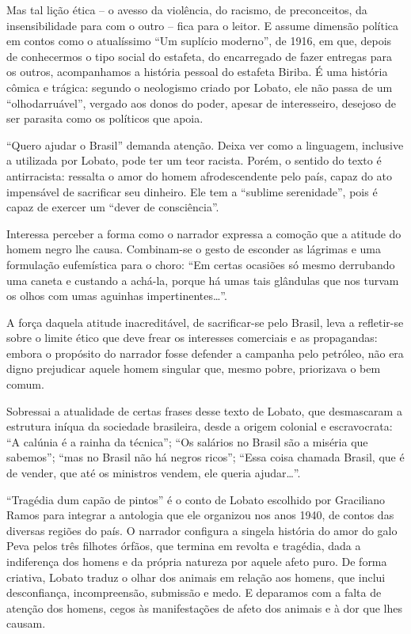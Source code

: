 Mas tal lição ética -- o avesso da violência, do racismo, de
preconceitos, da insensibilidade para com o outro -- fica para o leitor.
E assume dimensão política em contos como o atualíssimo ``Um suplício
moderno'', de 1916, em que, depois de conhecermos o tipo social do
estafeta, do encarregado de fazer entregas para os outros, acompanhamos
a história pessoal do estafeta Biriba. É uma história cômica e trágica:
segundo o neologismo criado por Lobato, ele não passa de um
``olhodarruável'', vergado aos donos do poder, apesar de interesseiro,
desejoso de ser parasita como os políticos que apoia.

``Quero ajudar o Brasil'' demanda atenção. Deixa ver como a linguagem,
inclusive a utilizada por Lobato, pode ter um teor racista. Porém, o
sentido do texto é antirracista: ressalta o amor do homem
afrodescendente pelo país, capaz do ato impensável de sacrificar seu
dinheiro. Ele tem a ``sublime serenidade'', pois é capaz de exercer um
``dever de consciência''.

Interessa perceber a forma como o narrador expressa a comoção que a
atitude do homem negro lhe causa. Combinam-se o gesto de esconder as
lágrimas e uma formulação eufemística para o choro: ``Em certas ocasiões
só mesmo derrubando uma caneta e custando a achá-la, porque há umas tais
glândulas que nos turvam os olhos com umas aguinhas
impertinentes\ldots{}''.

A força daquela atitude inacreditável, de sacrificar-se pelo Brasil,
leva a refletir-se sobre o limite ético que deve frear os interesses
comerciais e as propagandas: embora o propósito do narrador fosse
defender a campanha pelo petróleo, não era digno prejudicar aquele homem
singular que, mesmo pobre, priorizava o bem comum.

Sobressai a atualidade de certas frases desse texto de Lobato, que
desmascaram a estrutura iníqua da sociedade brasileira, desde a origem
colonial e escravocrata: ``A calúnia é a rainha da técnica''; ``Os
salários no Brasil são a miséria que sabemos''; ``mas no Brasil não há
negros ricos''; ``Essa coisa chamada Brasil, que é de vender, que até os
ministros vendem, ele queria ajudar\ldots{}''.

``Tragédia dum capão de pintos'' é o conto de Lobato escolhido por
Graciliano Ramos para integrar a antologia que ele organizou nos anos
1940, de contos das diversas regiões do país. O narrador configura a
singela história do amor do galo Peva pelos três filhotes órfãos, que
termina em revolta e tragédia, dada a indiferença dos homens e da
própria natureza por aquele afeto puro. De forma criativa, Lobato traduz
o olhar dos animais em relação aos homens, que inclui desconfiança,
incompreensão, submissão e medo. E deparamos com a falta de atenção dos
homens, cegos às manifestações de afeto dos animais e à dor que lhes
causam.

